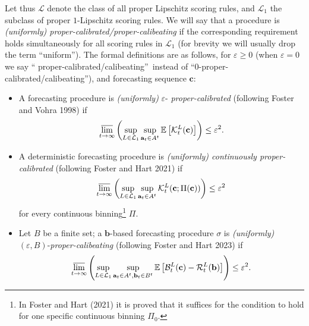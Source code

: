 \documentclass[12pt,a4paper,notitlepage]{article}
\begin{document}
Let thus $\mathcal{L}$ denote the class of all proper Lipschitz scoring
rules, and $\mathcal{L}_{1}$ the subclass of proper $1$-Lipschitz scoring
rules. We will say that a procedure is \emph{(uniformly)
proper-calibrated/proper-calibeating} if the corresponding requirement holds
simultaneously for all scoring rules in $\mathcal{L}_{1}$ (for brevity we
will usually drop the term \textquotedblleft uniform\textquotedblright ).
The formal definitions are as follows, for $\varepsilon \geq 0$ (when $%
\varepsilon =0$ we say \textquotedblleft
proper-calibrated/calibeating\textquotedblright\ instead of
\textquotedblleft $0$-proper-calibrated/calibeating\textquotedblright ), and
forecasting sequence $\mathbf{c}$:

\begin{itemize}
\item A forecasting procedure is \emph{(uniformly) }$\varepsilon $-\emph{%
proper-calibrated} (following Foster and Vohra 1998) if%
\begin{equation*}
\varlimsup_{t\rightarrow \infty }\left( \sup_{L\in \mathcal{L}_{1}}\sup_{%
\mathbf{a}_{t}\in A^{t}}\mathbb{E}\left[ \mathcal{K}_{t}^{L}(\mathbf{c})%
\right] \right) \leq \varepsilon ^{2}.
\end{equation*}

\item A deterministic forecasting procedure is \emph{(uniformly)
continuously proper-calibrated} (following Foster and Hart 2021) if%
\begin{equation*}
\varlimsup_{t\rightarrow \infty }\left( \sup_{L\in \mathcal{L}_{1}}\sup_{%
\mathbf{a}_{t}\in A^{t}}\mathcal{K}_{t}^{L}(\mathbf{c};\Pi (\mathbf{c}%
))\right) \leq \varepsilon ^{2}
\end{equation*}%
for every continuous binning\footnote{%
In Foster and Hart (2021) it is proved that it suffices for the condition to
hold for one specific continuous binning $\Pi _{0}$.} $\Pi $.

\item Let $B$ be a finite set; a $\mathbf{b}$-based forecasting procedure $%
\sigma $ is \emph{(uniformly) }$(\varepsilon ,B)$-\emph{proper-calibeating }%
(following Foster and Hart 2023) if%
\begin{equation*}
\varlimsup_{t\rightarrow \infty }\left( \sup_{L\in \mathcal{L}_{1}}\sup_{%
\mathbf{a}_{t}\in A^{t},\mathbf{b}_{t}\in B^{t}}\mathbb{E}\left[ \mathcal{B}%
_{t}^{L}(\mathbf{c})-\mathcal{R}_{t}^{L}(\mathbf{b})\right] \right) \leq
\varepsilon ^{2}.
\end{equation*}
\end{itemize}
\end{document}
